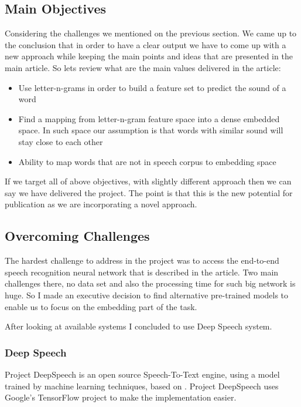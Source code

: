 
\subsection{Main Objectives}
Considering the challenges we mentioned on the previous section. We came up  to the conclusion that in order to have a clear output we have to come up with a new approach while keeping the main points and ideas that are presented in the main article. So lets review what are the main values delivered in the article: 
\begin{itemize}
    \item Use letter-n-grams in order to build a feature set to predict the sound of a word
    \item Find a mapping from letter-n-gram feature space into  a dense embedded space. In such space our assumption is that words with similar sound will stay close to each other
    \item Ability to map words that are not in speech corpus to embedding space    
\end{itemize}

If we target all of above objectives, with slightly different approach then we can say we have delivered  the project. The point is that this is the new potential for publication as we are incorporating a novel approach. 

\subsection{Overcoming Challenges}
The hardest challenge to address in the project was to access  the end-to-end speech recognition neural network that is described in the article. Two main challenges there, no data set and also the processing time for such big network is huge. So I made an executive decision to find alternative pre-trained models to enable us to focus on the embedding part of the task. 

After looking at available systems I concluded to use Deep Speech system. 

\subsubsection{Deep Speech}
Project DeepSpeech is an open source Speech-To-Text engine, using a model trained by machine learning techniques, based on \cite{DBLP:journals/corr/HannunCCCDEPSSCN14}. Project DeepSpeech uses Google's TensorFlow project to make the implementation easier.


